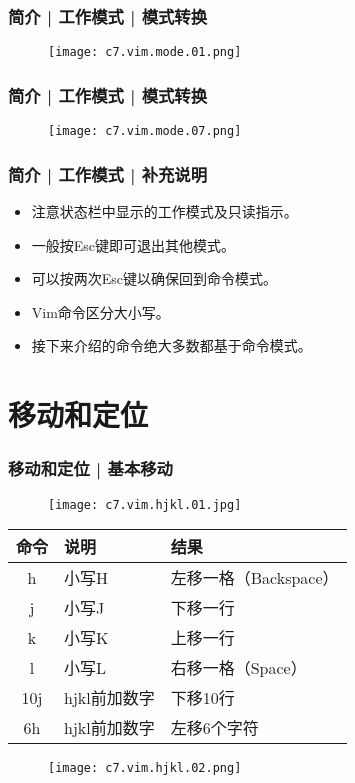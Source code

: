 \begin{frame}
  \frametitle{简介 | 工作模式 | \alert{模式转换}}
  \begin{figure}
    \centering
    \texttt{[image: c7.vim.mode.01.png]}
  \end{figure}
\end{frame}

\begin{frame}
  \frametitle{简介 | 工作模式 | 模式转换}
  \begin{figure}
    \centering
    \texttt{[image: c7.vim.mode.07.png]}
  \end{figure}
\end{frame}

\begin{frame}
  \frametitle{简介 | 工作模式 | 补充说明}
  \begin{itemize}[<+->]
    \item 注意状态栏中显示的工作模式及只读指示。
    \item 一般按Esc键即可退出其他模式。
    \item 可以按两次Esc键以确保回到命令模式。
    \item Vim命令区分大小写。
    \item 接下来介绍的命令绝大多数都基于命令模式。
  \end{itemize}
\end{frame}

\section{移动和定位}
\begin{frame}
  \frametitle{移动和定位 | \alert{基本移动}}
  \begin{figure}
    \centering
    \texttt{[image: c7.vim.hjkl.01.jpg]}
  \end{figure}
  \begin{table}
    \centering
    \begin{tabularx}{0.8\textwidth}{cXX}
      \hline
      \rowcolor{blue!50}命令 & 说明 & 结果\\
      \hline
      h & 小写H & 左移一格（Backspace）\\
      j & 小写J & 下移一行\\
      k & 小写K & 上移一行\\
      l & 小写L & 右移一格（Space）\\
      10j & hjkl前加数字 & 下移10行\\
      6h & hjkl前加数字 & 左移6个字符\\
      \hline
    \end{tabularx}
  \end{table}
  \begin{figure}
    \centering
    \texttt{[image: c7.vim.hjkl.02.png]}
  \end{figure}
\end{frame}

